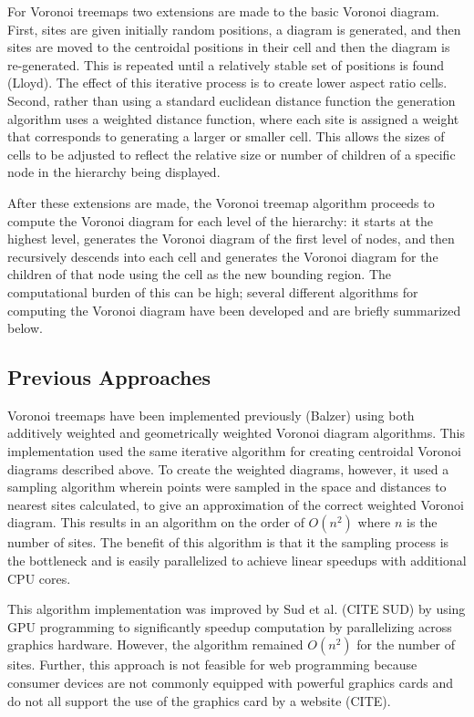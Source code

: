 \documentclass{acm_proc_article-sp}
\begin{document}
For Voronoi treemaps two extensions are made to the basic Voronoi
diagram. First, sites are given initially random positions, a diagram
is generated, and then sites are moved to the centroidal positions in
their cell and then the diagram is re-generated. This is repeated
until a relatively stable set of positions is found (Lloyd). The effect of
this iterative process is to create lower aspect ratio cells. Second,
rather than using a standard euclidean distance function the
generation algorithm uses a weighted distance function, where each
site is assigned a weight that corresponds to generating a larger or
smaller cell. This allows the sizes of cells to be adjusted to reflect
the relative size or number of children of a specific node in the
hierarchy being displayed. 

After these extensions are made, the Voronoi treemap algorithm
proceeds to compute the Voronoi diagram for each level of the
hierarchy: it starts at the highest level, generates the Voronoi
diagram of the first level of nodes, and then recursively descends
into each cell and generates the Voronoi diagram for the children of
that node using the cell as the new bounding region. The computational
burden of this can be high; several different algorithms for computing
the Voronoi diagram have been developed and are briefly summarized
below.

\subsection{Previous Approaches}
Voronoi treemaps have been implemented previously (Balzer) using both
additively weighted and geometrically weighted Voronoi diagram
algorithms. This implementation used the same iterative algorithm for
creating centroidal Voronoi diagrams described above. To create the
weighted diagrams, however, it used a sampling algorithm wherein
points were sampled in the space and distances to nearest sites
calculated, to give an approximation of the correct weighted Voronoi
diagram. This results in an algorithm on the order of $O(n^2)$ where
$n$ is the number of sites. The benefit of this algorithm is that it
the sampling process is the bottleneck and is easily parallelized to
achieve linear speedups with additional CPU cores.

This algorithm implementation was improved by Sud et al. (CITE SUD) by
using GPU programming to significantly speedup computation by
parallelizing across graphics hardware. However, the algorithm
remained $O(n^2)$ for the number of sites. Further, this approach is
not feasible for web programming because consumer devices are not
commonly equipped with powerful graphics cards and do not all support
the use of the graphics card by a website (CITE).
\end{document}
